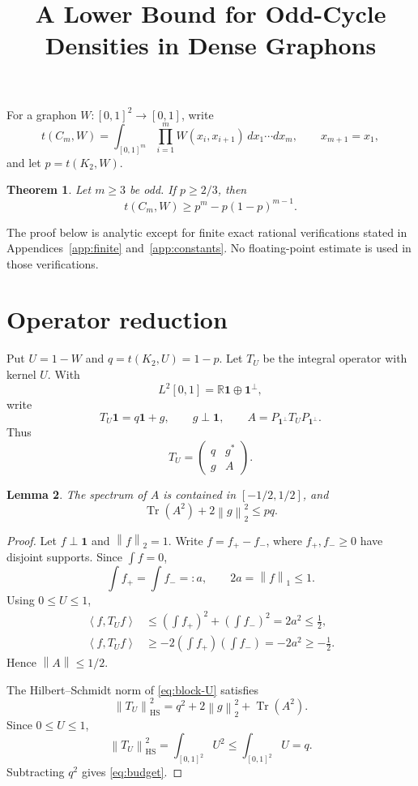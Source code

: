 \documentclass[11pt]{article}
\title{A Lower Bound for Odd-Cycle Densities in Dense Graphons}
\author{}
\date{}
\numberwithin{equation}{section}
\newtheorem{theorem}{Theorem}
\newtheorem{lemma}[theorem]{Lemma}
\newcommand{\one}{\mathbf 1}
\newcommand{\R}{\mathbb R}
\newcommand{\Tr}{\operatorname{Tr}}
\newcommand{\ip}[2]{\left\langle #1,#2\right\rangle}
\newcommand{\norm}[1]{\left\lVert #1\right\rVert}
\begin{document}
\maketitle
\vspace{-2em}

For a graphon $W:[0,1]^2\to[0,1]$, write
\[
 t(C_m,W)=\int_{[0,1]^m}\prod_{i=1}^{m}W(x_i,x_{i+1})\,dx_1\cdots dx_m,
 \qquad x_{m+1}=x_1,
\]
and let $p=t(K_2,W)$.

\begin{theorem}\label{thm:main}
Let $m\ge3$ be odd. If $p\ge 2/3$, then
\[
        t(C_m,W)\ge p^m-p(1-p)^{m-1}.
\]
\end{theorem}

The proof below is analytic except for finite exact rational verifications stated in Appendices~\ref{app:finite} and~\ref{app:constants}. No floating-point estimate is used in those verifications.

\section{Operator reduction}

Put $U=1-W$ and $q=t(K_2,U)=1-p$. Let $T_U$ be the integral operator with kernel $U$. With
\[
        L^2[0,1]=\R\one\oplus \one^\perp,
\]
write
\[
        T_U\one=q\one+g,
        \qquad g\perp\one,
        \qquad A=P_{\one^\perp}T_UP_{\one^\perp}.
\]
Thus
\begin{equation}\label{eq:block-U}
        T_U=
        \begin{pmatrix}
          q&g^*\\
          g&A
        \end{pmatrix}.
\end{equation}

\begin{lemma}\label{lem:support-budget}
The spectrum of $A$ is contained in $[-1/2,1/2]$, and
\begin{equation}\label{eq:budget}
        \Tr(A^2)+2\norm{g}_2^2\le pq.
\end{equation}
\end{lemma}

\begin{proof}
Let $f\perp\one$ and $\norm f_2=1$. Write $f=f_+-f_-$, where $f_+,f_-\ge0$ have disjoint supports. Since $\int f=0$,
\[
        \int f_+=\int f_-=:a,
        \qquad 2a=\norm f_1\le1.
\]
Using $0\le U\le1$,
\[
\begin{aligned}
 \ip{f}{T_Uf}
 &\le \left(\int f_+\right)^2+\left(\int f_-\right)^2
 =2a^2\le\frac12,\\
 \ip{f}{T_Uf}
 &\ge-2\left(\int f_+\right)\left(\int f_-\right)
 =-2a^2\ge-\frac12.
\end{aligned}
\]
Hence $\norm A\le1/2$.

The Hilbert--Schmidt norm of \eqref{eq:block-U} satisfies
\[
        \norm{T_U}_{\mathrm{HS}}^2
        =q^2+2\norm g_2^2+\Tr(A^2).
\]
Since $0\le U\le1$,
\[
        \norm{T_U}_{\mathrm{HS}}^2=\int_{[0,1]^2}U^2
        \le\int_{[0,1]^2}U=q.
\]
Subtracting $q^2$ gives \eqref{eq:budget}.
\end{proof}
\end{document}
